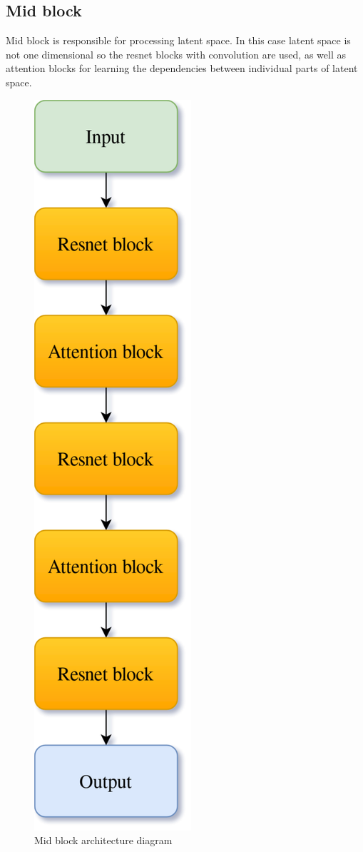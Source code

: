 \documentclass[11pt,a4paper]{report}
\begin{document}
\subsection{Mid block}
Mid block is responsible for processing latent space. In this case latent space is not one dimensional so the resnet blocks with convolution are used, as well as attention blocks for learning the dependencies between individual parts of latent space.
\begin{figure}[H]
	\centering
	\includegraphics[scale=0.2]{images/MidBlock.drawio}
    \caption{Mid block architecture diagram}
\end{figure}
\end{document}
